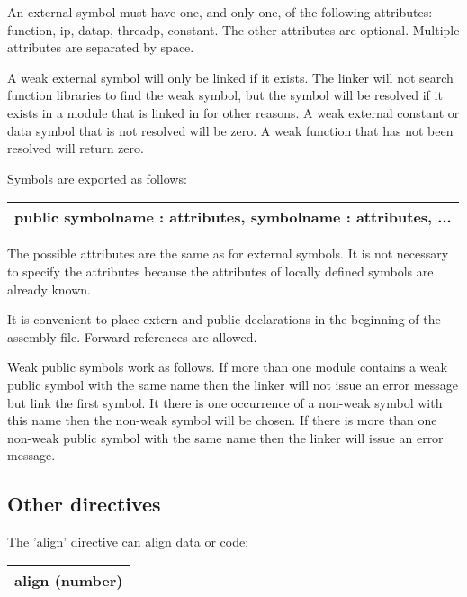 \documentclass[forwardcom.tex]{subfiles}
\begin{document}
An external symbol must have one, and only one, of the following attributes: function, ip, datap, threadp, constant.
The other attributes are optional. Multiple attributes are separated by space.
\vspace{2mm}

A weak external symbol will only be linked if it exists. The linker will not search function libraries to find the weak symbol, but the symbol will be resolved if it exists in a module that is linked in for other reasons.
A weak external constant or data symbol that is not resolved will be zero. A weak function that has not  been resolved will return zero.
\vspace{2mm}

Symbols are exported as follows:
\vspace{2mm}

\begin{tabular}{|p{150mm}|}
\hline
\hspace{4mm} public symbolname : attributes, symbolname : attributes, ...\\
\hline
\end{tabular}
\vspace{2mm}

The possible attributes are the same as for external symbols. It is not necessary to specify the attributes because the attributes of locally defined symbols are already known. 
\vspace{2mm}

It is convenient to place extern and public declarations in the beginning of the assembly file. Forward references are allowed.
\vspace{2mm}

Weak public symbols work as follows. If more than one module contains a weak public symbol with the same name then the linker will not issue an error message but link the first symbol.
It there is one occurrence of a non-weak symbol with this name then the non-weak symbol will be chosen. If there is more than one non-weak public symbol with the same name then the linker will issue an error message.


\subsection{Other directives} \label{assemblyOtherDirectives}

The 'align' directive can align data or code:
\vspace{2mm}

\begin{tabular}{|p{150mm}|}
\hline
\hspace{4mm} align (number)\\
\hline
\end{tabular}
\vspace{2mm}
\end{document}
